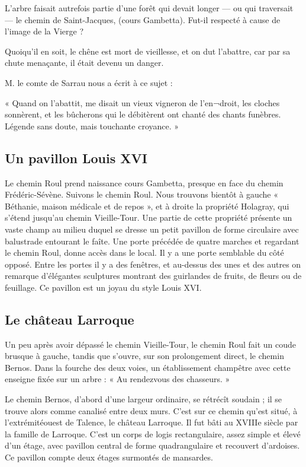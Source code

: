 L'arbre faisait autrefois partie d'une forêt qui devait longer — ou qui traversait — le chemin de Saint-Jacques, (cours Gambetta). Fut-il respecté à cause de l'image de la Vierge ?

Quoiqu'il en soit, le chêne est mort de vieillesse, et on dut l'abattre, car par sa chute menaçante, il était devenu un danger.

M. le comte de Sarrau nous a écrit à ce sujet :

« Quand on l'abattit, me disait un vieux vigneron de l'en¬droit, les cloches sonnèrent, et les bûcherons qui le débitèrent ont chanté des chants funèbres. Légende sans doute, mais touchante croyance. »

\subsection{Un pavillon Louis XVI}

Le chemin Roul prend naissance cours Gambetta, presque en face du chemin Frédéric-Sévène. Suivons le chemin Roul. Nous trouvons bientôt à gauche « Béthanie, maison médicale et de repos », et à droite la propriété Holagray, qui s'étend jusqu'au chemin Vieille-Tour. Une partie de cette propriété présente un vaste champ au milieu duquel se dresse un petit pavillon de forme circulaire avec balustrade entourant le faîte. Une porte précédée de quatre marches et regardant le chemin Roul, donne accès dans le local. Il y a une porte semblable du côté opposé. Entre les portes il y a des fenêtres, et au-dessus des unes et des autres on remarque d'élégantes sculptures montrant des guirlandes de fruits, de fleurs ou de feuillage. Ce pavillon est un joyau du style Louis XVI.

\subsection{Le château Larroque}

Un peu après avoir dépassé le chemin Vieille-Tour, le chemin Roul fait un coude brusque à gauche, tandis que s'ouvre, sur son prolongement direct, le chemin Bernos. Dans la fourche des deux voies, un établissement champêtre avec cette enseigne fixée sur un arbre : « Au rendezvous des chasseurs. »

Le chemin Bernos, d'abord d'une largeur ordinaire, se rétrécît soudain ; il se trouve alors comme canalisé entre deux murs. C'est sur ce chemin qu'est situé, à l'extrémitéouest de Talence, le château Larroque. Il fut bâti au XVIIIe siècle par la famille de Larroque. C'est un corps de logis rectangulaire, assez simple et élevé d'un étage, avec pavillon central de forme quadrangulaire et recouvert d'ardoises. Ce pavillon compte deux étages surmontés de mansardes.

